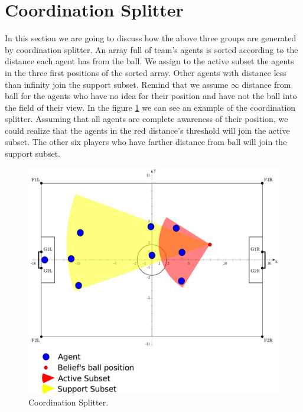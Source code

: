 \section{Coordination Splitter}
In this section we are going to discuss how the above three groups are generated by coordination splitter. An array full of team's agents is sorted according to the distance each agent has from the ball. We assign to the active subset the agents in the three first positions of the sorted array.
Other agents with distance less than infinity join the support subset.
Remind that we assume $\infty$ distance from ball for the agents who have no idea for their position and have not the ball into the field of their view.
In the figure \ref{fig:Splitter} we can see an example of the coordination splitter. Assuming that all agents are complete awareness of their position, we could realize that the agents in the red distance's threshold will join the active subset. The other six players who have farther distance from ball will join the support subset.
\begin{figure}[htb!]
\centering
  \includegraphics[width=\textwidth]{Chapter4/figures/Splitter.pdf}
  \caption{Coordination Splitter.} 
  \label{fig:Splitter}
\end{figure}

